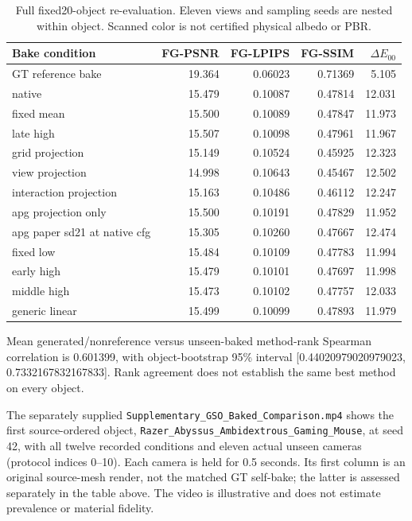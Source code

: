\documentclass[11pt]{article}
\begin{document}
\begin{table}[ht]\centering\scriptsize\begin{tabular}{lrrrr}\toprule Bake condition & FG-PSNR & FG-LPIPS & FG-SSIM & $\Delta E_{00}$ \\\midrule
GT reference bake & 19.364 & 0.06023 & 0.71369 & 5.105 \\
native & 15.479 & 0.10087 & 0.47814 & 12.031 \\
fixed mean & 15.500 & 0.10089 & 0.47847 & 11.973 \\
late high & 15.507 & 0.10098 & 0.47961 & 11.967 \\
grid projection & 15.149 & 0.10524 & 0.45925 & 12.323 \\
view projection & 14.998 & 0.10643 & 0.45467 & 12.502 \\
interaction projection & 15.163 & 0.10486 & 0.46112 & 12.247 \\
apg projection only & 15.500 & 0.10191 & 0.47829 & 11.952 \\
apg paper sd21 at native cfg & 15.305 & 0.10260 & 0.47667 & 12.474 \\
fixed low & 15.484 & 0.10109 & 0.47783 & 11.994 \\
early high & 15.479 & 0.10101 & 0.47697 & 11.998 \\
middle high & 15.473 & 0.10102 & 0.47757 & 12.033 \\
generic linear & 15.499 & 0.10099 & 0.47893 & 11.979 \\
\bottomrule\end{tabular}\caption{Full fixed20-object re-evaluation. Eleven views and sampling seeds are nested within object. Scanned color is not certified physical albedo or PBR.}\end{table}
Mean generated/nonreference versus unseen-baked method-rank Spearman correlation is 0.601399, with object-bootstrap 95\% interval [0.44020979020979023, 0.7332167832167833]. Rank agreement does not establish the same best method on every object.


The separately supplied \texttt{Supplementary\_GSO\_Baked\_Comparison.mp4} shows the first source-ordered object, \texttt{Razer\_Abyssus\_Ambidextrous\_Gaming\_Mouse}, at seed 42, with all twelve recorded conditions and eleven actual unseen cameras (protocol indices 0--10). Each camera is held for 0.5 seconds. Its first column is an original source-mesh render, not the matched GT self-bake; the latter is assessed separately in the table above. The video is illustrative and does not estimate prevalence or material fidelity.
\end{document}
